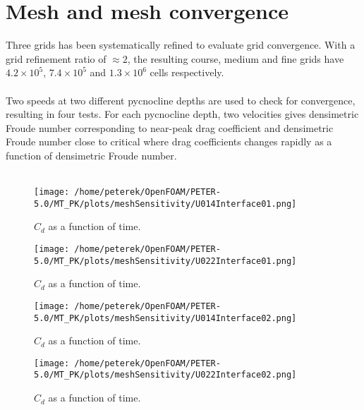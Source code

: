 \documentclass[a4paper, 12pt]{report}
\begin{document}
\section{Mesh and mesh convergence}
Three grids has been systematically refined to evaluate grid convergence. With a grid refinement ratio of $\approx 2$, the resulting course, medium and fine grids have $4.2\times 10^5$, $7.4\times 10^5$ and $1.3\times 10^6$ cells respectively.\\
\\
Two speeds at two different pycnocline depths are used to check for convergence, resulting in  four tests. For each pycnocline depth, two velocities gives  densimetric Froude number corresponding to near-peak drag coefficient and densimetric Froude number close to critical  where drag coefficients changes rapidly as a function of densimetric Froude number.\\
\\ 
\begin{minipage}{.45\textwidth} 
	\begin{figure}[H]
		\centering
		\texttt{[image: /home/peterek/OpenFOAM/PETER-5.0/MT\_PK/plots/meshSensitivity/U014Interface01.png]}
		\caption{$C_d$ as a function of time. \\ \textit{}}
		\label{fig:convTestIf01U01}
	\end{figure}
\end{minipage}\hfill
\vspace{2ex}
\begin{minipage}{.45\textwidth} 
	\begin{figure}[H]
		\centering
		\texttt{[image: /home/peterek/OpenFOAM/PETER-5.0/MT\_PK/plots/meshSensitivity/U022Interface01.png]}
		\caption{$C_d$ as a function of time. \\ \textit{}}
		\label{fig:convTestIf01U022}
	\end{figure}
\end{minipage}\hfill
\vspace{2ex}
\begin{minipage}{.45\textwidth} 
	\begin{figure}[H]
		\centering
		\texttt{[image: /home/peterek/OpenFOAM/PETER-5.0/MT\_PK/plots/meshSensitivity/U014Interface02.png]}
		\caption{$C_d$ as a function of time. \\ \textit{}}
		\label{fig:convTestIf02U016}
	\end{figure}
\end{minipage}\hfill
\vspace{2ex}
\begin{minipage}{.45\textwidth} 
	\begin{figure}[H]
		\centering
		\texttt{[image: /home/peterek/OpenFOAM/PETER-5.0/MT\_PK/plots/meshSensitivity/U022Interface02.png]}
		\caption{$C_d$ as a function of time. \\ \textit{}}
		\label{fig:convTestIf02U022}
	\end{figure}
\end{minipage}\hfill
\vspace{2ex}
\end{document}
